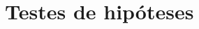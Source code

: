 \documentclass[a4paper, 12pt, openright, oneside, german, french, english, brazil]{abntex2}
\begin{document}

      
	
	\section{Testes de hipóteses}
	
\end{document}

